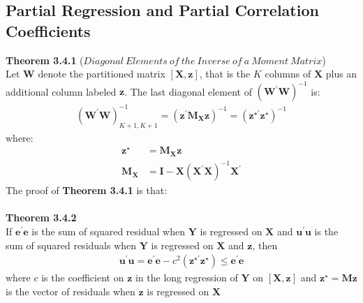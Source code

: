 \documentclass{article}
\begin{document}
\subsection{Partial Regression and Partial Correlation Coefficients}
\textbf{Theorem 3.4.1} ($Diagonal\ Elements\ of\ the\ Inverse\ of\ a\ Moment\ Matrix$)\\
Let $\boldsymbol{W}$ denote the partitioned matrix $[\boldsymbol{X}, \boldsymbol{z}]$, that is the $K$ columns of $\boldsymbol{X}$ plus an additional column labeled $\boldsymbol{z}$. The last diagonal element of $(\boldsymbol{W}^\prime \boldsymbol{W})^{-1}$ is:
	\begin{align*}
		(\boldsymbol{W}^\prime \boldsymbol{W})^{-1}_{K+1, K+1} = (\boldsymbol{z}^\prime \boldsymbol{M_X} \boldsymbol{z})^{-1} = (\boldsymbol{z}^{\star\prime} \boldsymbol{z}^\star)^{-1}
	\end{align*} 
where:
	\begin{align*}
		\boldsymbol{z}^\star &= \boldsymbol{M_X} \boldsymbol{z}\\
		\boldsymbol{M_X} &= \boldsymbol{I} - \boldsymbol{X} (\boldsymbol{X}^\prime \boldsymbol{X})^{-1} \boldsymbol{X}^\prime
	\end{align*}
The proof of \textbf{Theorem 3.4.1} is that:\\\\
\textbf{Theorem 3.4.2}\\
If $\boldsymbol{e}^\prime \boldsymbol{e}$ is the sum of squared residual when $\boldsymbol{Y}$ is regressed on $\boldsymbol{X}$ and $\boldsymbol{u}^\prime \boldsymbol{u}$ is the sum of squared residuals when $\boldsymbol{Y}$ is regressed on $\boldsymbol{X}$ and $\boldsymbol{z}$, then
	\begin{align*}
		\boldsymbol{u}^\prime \boldsymbol{u} = \boldsymbol{e}^\prime \boldsymbol{e} - c^2 (\boldsymbol{z}^{\star\prime} \boldsymbol{z}^\star) \leq \boldsymbol{e}^\prime \boldsymbol{e}
	\end{align*}
where $c$ is the coefficient on $\boldsymbol{z}$ in the long regression of $\boldsymbol{Y}$ on $[\boldsymbol{X}, \boldsymbol{z}]$ and $\boldsymbol{z}^\star = \boldsymbol{M} \boldsymbol{z}$ is the vector of residuals when $\boldsymbol{z}$ is regressed on $\boldsymbol{X}$
\end{document}
